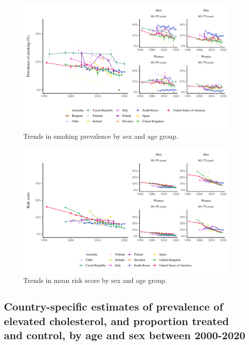 \documentclass[12pt]{article}
\begin{document}
\begin{appendix}
\begin{refsection}
\begin{landscape}
        \begin{figure}[H]
            \centering
            \includegraphics[width=\linewidth]{../3_figures/smoke.pdf}
            \caption{Trends in smoking prevalence by sex and age group.}
            \label{fig:smoker}
        \end{figure}

        \begin{figure}[H]
            \centering
            \includegraphics[width=\linewidth]{../3_figures/risk.pdf}
            \caption{Trends in mean risk score by sex and age group.}
            \label{fig:smoker}
        \end{figure}

        \subsection{Country-specific estimates of prevalence of elevated cholesterol, and proportion treated and control, by age and sex between 2000-2020}


\end{landscape}
\end{refsection}
\end{appendix}
\end{document}
